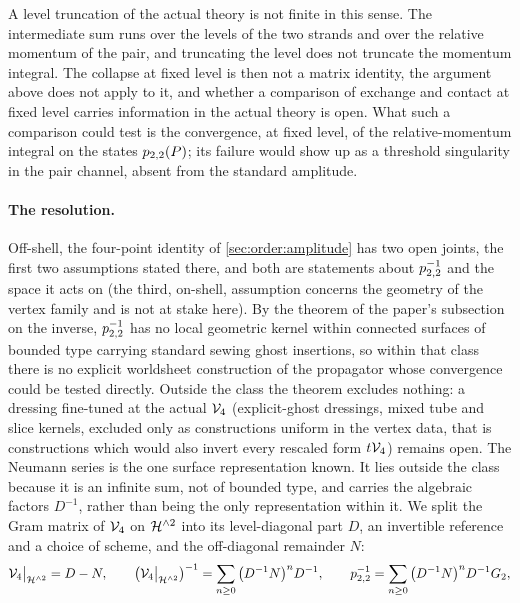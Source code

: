 A level truncation of the actual theory is not finite in this sense.
The intermediate sum runs over the levels of the two strands and over the relative momentum of the pair, and truncating the level does not truncate the momentum integral.
The collapse at fixed level is then not a matrix identity, the argument above does not apply to it, and whether a comparison of exchange and contact at fixed level carries information in the actual theory is open.
What such a comparison could test is the convergence, at fixed level, of the relative-momentum integral on the states $p_{2,2}(P)$; its failure would show up as a threshold singularity in the pair channel, absent from the standard amplitude.

\paragraph{The resolution.}
Off-shell, the four-point identity of \cref{sec:order:amplitude} has two open joints, the first two assumptions stated there, and both are statements about $p_{2,2}^{-1}$ and the space it acts on (the third, on-shell, assumption concerns the geometry of the vertex family and is not at stake here).
By the theorem of the paper's subsection on the inverse, $p_{2,2}^{-1}$ has no local geometric kernel within connected surfaces of bounded type carrying standard sewing ghost insertions, so within that class there is no explicit worldsheet construction of the propagator whose convergence could be tested directly.
Outside the class the theorem excludes nothing: a dressing fine-tuned at the actual $\mathcal{V}_{4}$ (explicit-ghost dressings, mixed tube and slice kernels, excluded only as constructions uniform in the vertex data, that is constructions which would also invert every rescaled form $t \mathcal{V}_{4}$) remains open.
The Neumann series is the one surface representation known.
It lies outside the class because it is an infinite sum, not of bounded type, and carries the algebraic factors $D^{-1}$, rather than being the only representation within it.
We split the Gram matrix of $\mathcal{V}_{4}$ on $\mathcal{H}^{\wedge 2}$ into its level-diagonal part $D$, an invertible reference and a choice of scheme, and the off-diagonal remainder $N$:
\begin{equation}
  \label{eq:ch9:neumann}
  \mathcal{V}_{4} \big|_{\mathcal{H}^{\wedge 2}}
    = D - N,
  \qquad
  \big( \mathcal{V}_{4} \big|_{\mathcal{H}^{\wedge 2}} \big)^{-1}
    = \sum_{n \ge 0} \big( D^{-1} N \big)^n D^{-1},
  \qquad
  p_{2,2}^{-1}
    = \sum_{n \ge 0} \big( D^{-1} N \big)^n D^{-1} G_2,
\end{equation}
